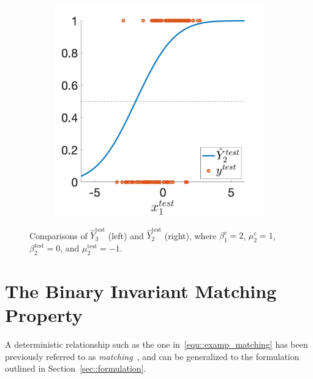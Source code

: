 \documentclass[conference,letterpaper]{IEEEtran}
\begin{document}
\begin{center}
\begin{figure}[h]
\begin{subfigure}[b]{0.45\columnwidth}
\includegraphics[width=\linewidth]{probit_example_X2.png}
    \label{fig:EYgZ2X3}
  \end{subfigure}
  \vspace{-1.5em}
  \caption{Comparisons of $\hat{Y}^{\text{test}}_3$ (left) and $\hat{Y}^{\text{test}}_2$ (right), where $\beta_1^e = 2$, $\mu^e_2 = 1$, $\beta_2^{\text{test}} = 0$, and $\mu^{\text{test}}_2 = -1$.}\label{fig:example}
  \vspace{-2em}
\end{figure}
\end{center}





\section{The Binary Invariant Matching Property}

A deterministic relationship such as the one in~\eqref{equ::examp_matching} has been previously referred to as \emph{matching}~\cite{du2023learning}, and can be generalized to the formulation outlined in Section~\ref{sec::formulation}.
\end{document}
